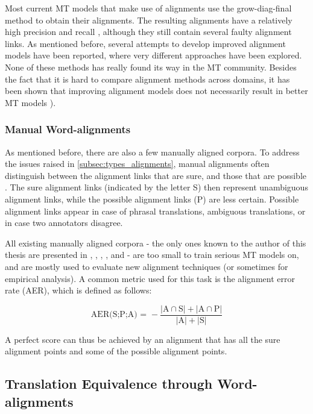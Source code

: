Most current MT models that make use of alignments use the grow-diag-final method to obtain their alignments. The resulting alignments have a relatively high precision and recall \citep{och2000improved}, although they still contain several faulty alignment links. As mentioned before, several attempts to develop improved alignment models have been reported, where very different approaches have been explored. None of these methods has really found its way in the MT community. Besides the fact that it is hard to compare alignment methods across domains, it has been shown that improving alignment models does not necessarily result in better MT models \citep{indurkhya2010handbook}).

\subsubsection{Manual Word-alignments}\label{subsubsec:man_alignments}

As mentioned before, there are also a few manually aligned corpora. To address the issues raised in \ref{subsec:types_alignments}, manual alignments often distinguish between the alignment links that are sure, and those that are possible \citep{lambert2005guidelines}. The sure alignment links (indicated by the letter S) then represent unambiguous alignment links, while the possible alignment links (P) are less certain. Possible alignment links appear in case of phrasal translations, ambiguous translations, or in case two annotators disagree. 

All existing manually aligned corpora - the only ones known to the author of this thesis are presented in \cite{och2000improved}, \cite{graca2008building}, \cite{mihalcea2003evaluation}, \cite{pado2006optimal}, and \cite{ahrenberg2000evaluation} - are too small to train serious MT models on, and are mostly used to evaluate new alignment techniques (or sometimes for empirical analysis). A common metric used for this task is the alignment error rate (AER), which is defined as follows:

$$
\text{AER(S;P;A) = } - \frac{|\text{A}\cap\text{S}| + |\text{A}\cap\text{P}|}{|\text{A}| + |\text{S}|}
$$

A perfect score can thus be achieved by an alignment that has all the sure alignment points and some of the possible alignment points.



\subsection{Translation Equivalence through Word-alignments}

